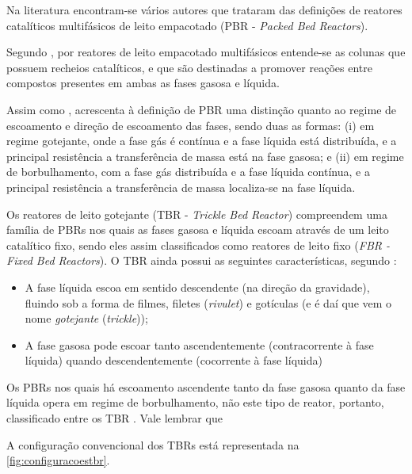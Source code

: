 Na literatura encontram-se vários autores que trataram das definições de
reatores catalíticos multifásicos de leito empacotado (PBR - \emph{Packed Bed
Reactors}).

Segundo , por reatores de leito empacotado multifásicos
entende-se as colunas que possuem recheios catalíticos, e que são destinadas a
promover reações entre compostos presentes em ambas as fases gasosa e líquida.

Assim como ,  acrescenta à
definição de PBR uma distinção quanto ao regime de escoamento e direção de
escoamento das fases, sendo duas as formas: (i) em regime gotejante, onde a fase
gás é contínua e a fase líquida está distribuída, e a principal resistência a
transferência de massa está na fase gasosa; e (ii) em regime de borbulhamento,
com a fase gás distribuída e a fase líquida contínua, e a principal resistência
a transferência de massa localiza-se na fase líquida.

Os reatores de leito gotejante (TBR - \emph{Trickle Bed Reactor}) compreendem uma família de
PBRs nos quais as fases gasosa e líquida escoam através de um leito catalítico fixo, sendo eles assim classificados como reatores de leito fixo (\emph{FBR - Fixed Bed Reactors}). O TBR ainda possui as seguintes características, segundo  :

\begin{itemize}
\item A fase líquida escoa em sentido descendente (na direção da gravidade),
fluindo sob a forma de filmes, filetes (\emph{rivulet}) e gotículas (e é daí
que vem o nome \textit{gotejante} (\emph{trickle}));
\item A fase gasosa pode escoar tanto ascendentemente (contracorrente à
fase líquida) quando descendentemente (cocorrente à fase líquida)
\end{itemize}

Os PBRs nos quais há escoamento ascendente tanto da fase gasosa quanto da
fase líquida opera em regime de borbulhamento, não este tipo de reator,
portanto, classificado entre os TBR \cite{Ancheyta2011}. Vale lembrar que

A configuração convencional dos TBRs está representada na
\autoref{fig:configuracoestbr}.

